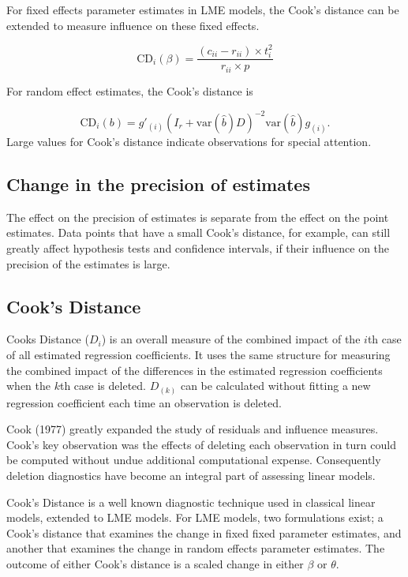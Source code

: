 \documentclass[12pt, a4paper]{article}
\begin{document}
For fixed effects parameter estimates in LME models, the  Cook's distance can be extended to measure influence on these fixed effects.


\[
\mbox{CD}_{i}(\beta) = \frac{(c_{ii} - r_{ii}) \times t^2_{i}}{r_{ii} \times p}
\]


For random effect estimates, the  Cook's distance is


\[
\mbox{CD}_{i}(b) = g{\prime}_{(i)} (I_{r} + \mbox{var}(\hat{b})D)^{-2}\mbox{var}(\hat{b})g_{(i)}.
\]
Large values for Cook's distance indicate observations for special attention.

\subsection{Change in the precision of estimates}

The effect on the precision of estimates is separate from the effect on the point estimates. Data points that
have a small Cook's distance, for example, can still greatly affect hypothesis tests and confidence intervals, if their  influence on the precision of the estimates is large.



\subsection{Cook's Distance}%
Cooks Distance ($D_{i}$) is an overall measure of the combined impact of the $i$th case of all estimated regression coefficients. It uses the same structure for measuring the combined impact of the differences in the estimated regression coefficients when the $k$th case is deleted. $D_{(k)}$ can be calculated without fitting
a new regression coefficient each time an observation is deleted.


Cook (1977) greatly expanded the study of residuals and influence measures. Cook's key observation was the effects of deleting each observation in turn could be computed without undue additional computational expense. Consequently deletion diagnostics have become an integral part of assessing linear models.

Cook's Distance is a well known diagnostic technique used in classical linear models, extended to LME models.  For LME models, two formulations exist; a Cook's distance that examines the change in fixed fixed parameter estimates, and another that examines the change in random effects parameter estimates. The outcome of either Cook's distance is a scaled change in either $\beta$ or $\theta$.
\end{document}
